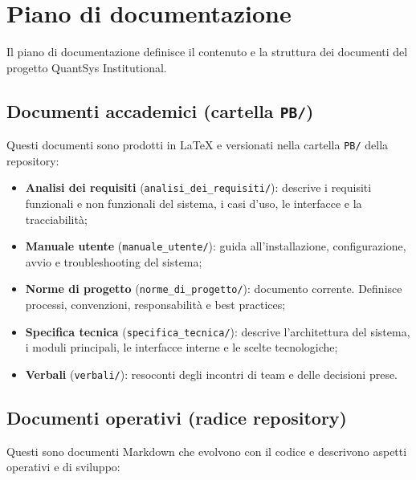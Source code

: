 \section{Piano di documentazione}

Il piano di documentazione definisce il contenuto e la struttura dei documenti del progetto QuantSys Institutional.

\subsection{Documenti accademici (cartella \texttt{PB/})}

Questi documenti sono prodotti in LaTeX e versionati nella cartella \texttt{PB/} della repository:

\begin{itemize}
  \item \textbf{Analisi dei requisiti} (\texttt{analisi\_dei\_requisiti/}): descrive i requisiti funzionali e non funzionali del sistema, i casi d'uso, le interfacce e la tracciabilità;
  \item \textbf{Manuale utente} (\texttt{manuale\_utente/}): guida all'installazione, configurazione, avvio e troubleshooting del sistema;
  \item \textbf{Norme di progetto} (\texttt{norme\_di\_progetto/}): documento corrente. Definisce processi, convenzioni, responsabilità e best practices;
  \item \textbf{Specifica tecnica} (\texttt{specifica\_tecnica/}): descrive l'architettura del sistema, i moduli principali, le interfacce interne e le scelte tecnologiche;
  \item \textbf{Verbali} (\texttt{verbali/}): resoconti degli incontri di team e delle decisioni prese.
\end{itemize}

\subsection{Documenti operativi (radice repository)}

Questi sono documenti Markdown che evolvono con il codice e descrivono aspetti operativi e di sviluppo:

